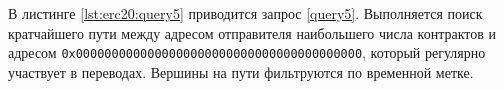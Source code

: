 В листинге \ref{lst:erc20:query5} приводится запрос \ref{query5}. Выполняется поиск кратчайшего пути между адресом
отправителя наибольшего числа контрактов и адресом \texttt{0x0000000000000000000000000000000000000000}, который регулярно
участвует в переводах. Вершины на пути фильтруются по временной метке.

